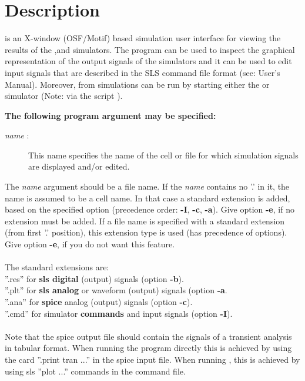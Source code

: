 \section{Description}
is an X-window (OSF/Motif) based simulation user interface
for viewing the results of the
,and
simulators.
The program can be used to inspect the graphical representation of the
output signals of the simulators and
it can be used to edit input signals that
are described in the SLS command file format (see: User's Manual).
Moreover,
from 
simulations can be run by starting either the
 or  simulator
(Note:  via the script ).
\par
{\bf The following program argument may be specified:}
\begin{description}
\item[{\it name} :]
This name specifies the name of the cell or file for
which simulation signals are displayed and/or edited.
\end{description}
The {\it name} argument should be a file name.
If the {\it name} contains no '.' in it,
the name is assumed to be a cell name.
In that case a standard extension is added, based on the specified
option (precedence order: {\bf -I}, {\bf -c}, {\bf -a}).
Give option {\bf -e}, if no extension must be added.
If a file name is specified with a standard extension (from first '.'
position), this extension type is used (has precedence of options).
Give option {\bf -e}, if you do not want this feature.
\\
\\
The standard extensions are:
\\
''.res''
for {\bf sls digital} (output) signals (option {\bf -b}).
\\
''.plt''
for {\bf sls analog} or waveform (output) signals (option {\bf -a}.
\\
''.ana''
for {\bf spice} analog (output) signals (option {\bf -c}).
\\
''.cmd''
for simulator {\bf commands} and input signals (option {\bf -I}).
\\
\\
Note that the spice output file should contain the signals
of a transient analysis in tabular format.
When running the program 
directly this is achieved by
using the card ''.print tran ...'' in the spice input file.
When running ,
this is achieved by using
sls ''plot ...'' commands in the command file.

